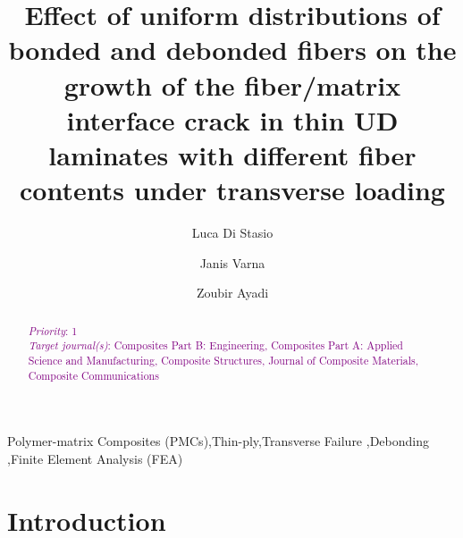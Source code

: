 \documentclass[review]{elsarticle}
\begin{document}
\begin{frontmatter}

\title{Effect of uniform distributions of bonded and debonded fibers on the growth of the fiber/matrix interface crack in thin UD laminates with different fiber contents under transverse loading}


\author[nancy,lulea]{Luca Di Stasio}
\author[lulea]{Janis Varna}
\author[nancy]{Zoubir Ayadi}


\address[nancy]{Universit\'e de Lorraine, EEIGM, IJL, 6 Rue Bastien Lepage, F-54010 Nancy, France}
\address[lulea]{Lule\aa\ University of Technology, University Campus, SE-97187 Lule\aa, Sweden}

\begin{abstract}
\noindent
\textcolor{purple}{{\em Priority}: 1}\\
\textcolor{purple}{{\em Target journal(s)}: Composites Part B: Engineering, Composites Part A: Applied Science and Manufacturing, Composite Structures, Journal of Composite Materials, Composite Communications}\\

\end{abstract}

\begin{keyword}
Polymer-matrix Composites (PMCs)\sep Thin-ply\sep Transverse Failure \sep Debonding \sep Finite Element Analysis (FEA)
\end{keyword}

\end{frontmatter}

\linenumbers

\section{Introduction}
\end{document}
